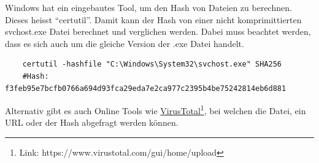 Windows hat ein eingebautes Tool, um den Hash von Dateien zu berechnen.
Dieses heisst ``certutil''.
Damit kann der Hash von einer nicht komprimittierten svchost.exe Datei berechnet und verglichen werden.
Dabei muss beachtet werden, dass es sich auch um die gleiche Version der .exe Datei handelt.

\begin{lstlisting}
    certutil -hashfile "C:\Windows\System32\svchost.exe" SHA256
    #Hash: f3feb95e7bcfb0766a694d93fca29eda7e2ca977c2395b4be75242814eb6d881
\end{lstlisting}

Alternativ gibt es auch Online Tools wie \href{https://www.virustotal.com/gui/home/upload}{VirusTotal}\footnote{Link: https://www.virustotal.com/gui/home/upload}, bei welchen die Datei, ein URL oder der Hash abgefragt werden können.